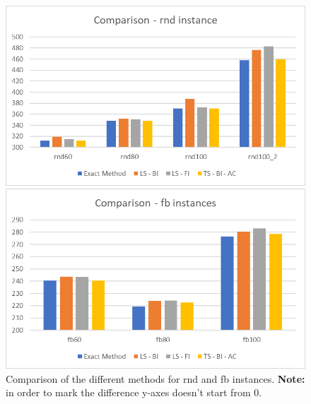 	\begin{figure}[h]
		\centering
		\includegraphics[width=\linewidth]{img/rnd-comparison}

		\vspace{1cm}

		\includegraphics[width=\linewidth]{img/fb-comparison}
		\caption{Comparison of the different methods for rnd and fb instances. \textbf{Note:} in order to mark the difference y-axes doesn't start from 0.}
		\label{fig:comparison}
	\end{figure}

	
	
	